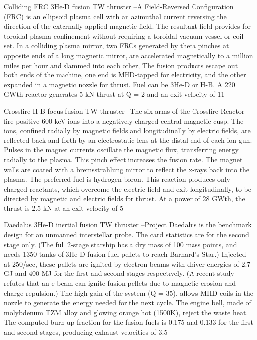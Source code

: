 \documentclass[a4paper]{book}
\begin{document}
Colliding FRC 3He-D fusion TW thruster –A Field-Reversed Configuration (FRC) is an ellipsoid plasma cell with an azimuthal current reversing the direction of the externally applied magnetic field. The resultant field provides for toroidal plasma confinement without requiring a toroidal vacuum vessel or coil set. In a colliding plasma mirror, two FRCs generated by theta pinches at opposite ends of a long magnetic mirror, are accelerated magnetically to a million miles per hour and slammed into each other, The fusion products escape out both ends of the machine, one end is MHD-tapped for electricity, and the other expanded in a magnetic nozzle for thrust. Fuel can be 3He-D or H-B. A 220 GWth reactor generates 5 kN thrust at Q = 2 and an exit velocity of 11%
 
Crossfire H-B focus fusion TW thruster –The six arms of the Crossfire Reactor fire positive 600 keV ions into a negatively-charged central magnetic cusp. The ions, confined radially by magnetic fields and longitudinally by electric fields, are reflected back and forth by an electrostatic lens at the distal end of each ion gun. Pulses in the magnet currents oscillate the magnetic flux, transferring energy radially to the plasma. This pinch effect increases the fusion rate. The magnet walls are coated with a bremsstrahlung mirror to reflect the x-rays back into the plasma. The preferred fuel is hydrogen-boron. This reaction produces only charged reactants, which overcome the electric field and exit longitudinally, to be directed by magnetic and electric fields for thrust. At a power of 28 GWth, the thrust is 2.5 kN at an exit velocity of 5%
 
Daedalus 3He-D inertial fusion TW thruster –Project Daedalus is the benchmark design for an unmanned interstellar probe. The card statistics are for the second stage only. (The full 2-stage starship has a dry mass of 100 mass points, and needs 1350 tanks of 3He-D fusion fuel pellets to reach Barnard’s Star.) Injected at 250/sec, these pellets are ignited by electron beams with driver energies of 2.7 GJ and 400 MJ for the first and second stages respectively. (A recent study refutes that an e-beam can ignite fusion pellets due to magnetic erosion and charge repulsion.) The high gain of the system (Q = 35), allows MHD coils in the nozzle to generate the energy needed for the next cycle. The engine bell, made of molybdenum TZM alloy and glowing orange hot (1500K), reject the waste heat. The computed burn-up fraction for the fusion fuels is 0.175 and 0.133 for the first and second stages, producing exhaust velocities of 3.5%
 
\end{document}
